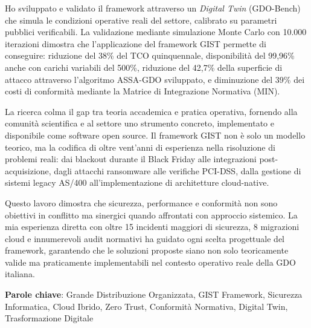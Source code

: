 \documentclass[12pt,a4paper,oneside]{book}
\begin{document}
Ho sviluppato e validato il framework attraverso un \textit{Digital Twin} (GDO-Bench) che simula le condizioni operative reali del settore, calibrato su parametri pubblici verificabili. La validazione mediante simulazione Monte Carlo con 10.000 iterazioni dimostra che l'applicazione del framework GIST permette di conseguire: riduzione del 38\% del TCO quinquennale, disponibilità del 99,96\% anche con carichi variabili del 500\%, riduzione del 42,7\% della superficie di attacco attraverso l'algoritmo ASSA-GDO sviluppato, e diminuzione del 39\% dei costi di conformità mediante la Matrice di Integrazione Normativa (MIN).

La ricerca colma il gap tra teoria accademica e pratica operativa, fornendo alla comunità scientifica e al settore uno strumento concreto, implementato e disponibile come software open source. Il framework GIST non è solo un modello teorico, ma la codifica di oltre vent'anni di esperienza nella risoluzione di problemi reali: dai blackout durante il Black Friday alle integrazioni post-acquisizione, dagli attacchi ransomware alle verifiche PCI-DSS, dalla gestione di sistemi legacy AS/400 all'implementazione di architetture cloud-native.

Questo lavoro dimostra che sicurezza, performance e conformità non sono obiettivi in conflitto ma sinergici quando affrontati con approccio sistemico. La mia esperienza diretta con oltre 15 incidenti maggiori di sicurezza, 8 migrazioni cloud e innumerevoli audit normativi ha guidato ogni scelta progettuale del framework, garantendo che le soluzioni proposte siano non solo teoricamente valide ma praticamente implementabili nel contesto operativo reale della GDO italiana.

\textbf{Parole chiave}: Grande Distribuzione Organizzata, GIST Framework, Sicurezza Informatica, Cloud Ibrido, Zero Trust, Conformità Normativa, Digital Twin, Trasformazione Digitale
\clearpage
\end{document}
